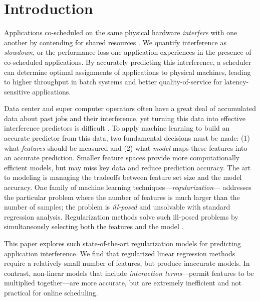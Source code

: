 \section{Introduction}
Applications co-scheduled on the same physical hardware
\emph{interfere} with one another by contending for shared resources
\cite{dwyer2012practical,kambadur2012measuring,Bubble-flux,merkel2010resource}.
We quantify interference as \emph{slowdown}, or the performance loss
one application experiences in the presence of co-scheduled
applications.  By accurately predicting this interference, a scheduler
can determine optimal assignments of applications to physical
machines, leading to higher throughput in batch systems and better
quality-of-service for latency-sensitive applications.

Data center and super computer operators often have a great deal of
accumulated data about past jobs and their interference, yet turning
this data into effective interference predictors is difficult
\cite{kambadur2012measuring}.  To apply machine learning to build an
accurate predictor from this data, two fundamental decisions must be
made: (1) what \emph{features} should be measured and (2) what
\emph{model} maps these features into an accurate prediction.  Smaller
feature spaces provide more computationally efficient models, but
may miss key data and reduce prediction accuracy.  The art to modeling
is managing the tradeoffs between feature set size and the model
accuracy.  One family of machine learning
techniques---\emph{regularization}--- addresses the particular problem
where the number of features is much larger than the number of
samples; \ie the problem is \emph{ill-posed} and unsolvable with
standard regression analysis.  Regularization methods solve such
ill-posed problems by simultaneously selecting both the features and
the model
\cite{hoerl1988ridge,tibshirani1996regression,zou2005regularization}.

This paper explores such state-of-the-art regularization models for
predicting application interference.  We find that regularized linear
regression methods require a relatively small number of features, but
produce inaccurate models.  In contrast, non-linear models that
include \emph{interaction terms}---\ie permit features to be
multiplied together---are more accurate, but are extremely inefficient
and not practical for online scheduling.

